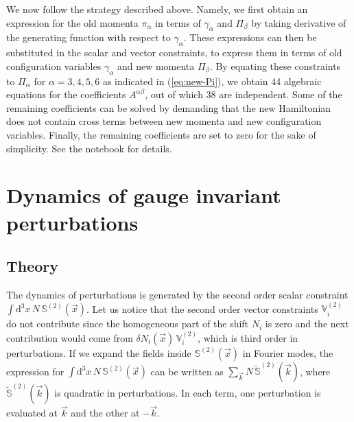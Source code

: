 \documentclass[11pt,tightenlines,eqsecnum,floats,aps,amsmath,amssymb,nofootinbib,prd,floatfix]{revtex4}
\def\d{\textrm{d}}
\newcommand{\<}{\langle}
\renewcommand{\>}{\rangle}
\begin{document}
We now follow the strategy described above. Namely, we first obtain an expression for the old momenta $\pi_{\alpha}$ in terms of $\gamma_{\alpha}$ and $\Pi_{\beta}$ by taking  derivative  of the generating function with respect to  $\gamma_{\alpha}$. These expressions can then be substituted in the scalar and vector constraints, to express them in terms of old configuration variables $\gamma_{\alpha}$ and new momenta $\Pi_{\beta}$.  By equating  these constraints to  $\Pi_{\alpha}$ for $\alpha=3,4,5,6$ as indicated in (\ref{eq:new-Pi}), we obtain 44 algebraic equations for the coefficients $A^{\alpha\beta}$, out of which 38 are independent. Some of the remaining coefficients can be solved by demanding that the new Hamiltonian does not contain  cross terms between new momenta and new configuration variables. Finally, the remaining coefficients are set to zero for the sake of simplicity. See the notebook \cite{ntbk} for details.


\section{Dynamics of gauge invariant perturbations}\label{sec:2nd-H}

\subsection{Theory}


The dynamics of perturbations is generated by the second order scalar constraint $\int \d^3x\,  N \, \mathbb{S}^{(2)}(\vec x)$. Let us notice that the second order vector constraints $\mathbb{V}_{i}^{(2)}$ do not contribute since the homogeneous part of the shift $N_i$ is zero and the next contribution would come from $\delta N_i(\vec x)\, \mathbb{V}_{i}^{(2)}$, which is third order in perturbations. If we expand the fields inside $\mathbb{S}^{(2)}(\vec x)$ in Fourier modes, the expression for $\int \d^3x\,  N \, \mathbb{S}^{(2)}(\vec x)$ can be written as $\sum_{\vec {k}} N \, \tilde{\mathbb{S}}^{(2)}(\vec k)$, where $\tilde{\mathbb{S}}^{(2)}(\vec k)$ is quadratic in perturbations. In each term, one perturbation is evaluated at $\vec k$ and the other at $-\vec k$. 
\end{document}
